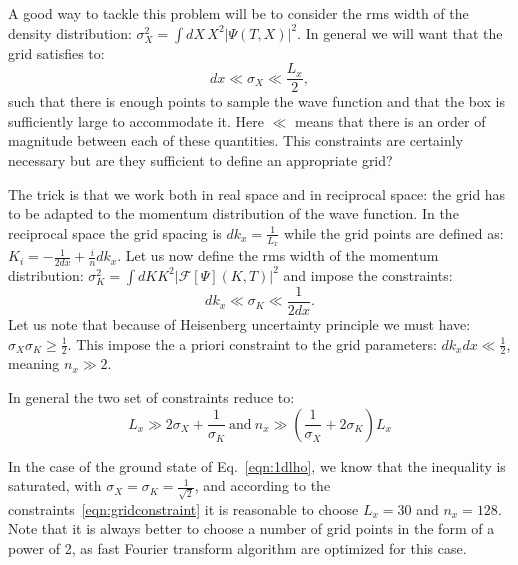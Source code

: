 \documentclass[12pt,a4paper]{report}
\newcommand{\abs}[1]{\left|#1\right|}
\newcommand{\fft}[1]{\mathcal{F}\left[#1\right]}
\begin{document}
A good way to tackle this problem will be to consider the rms width of the density distribution: $\sigma_X^2=\int dX\,X^2\abs{\Psi(T,X)}^2$.
In general we will want that the grid satisfies to:
\begin{equation}
dx\ll\sigma_X\ll\frac{L_x}{2},
\end{equation}
such that there is enough points to sample the wave function and that the box is sufficiently large to accommodate it.
Here $\ll$ means that there is an order of magnitude between each of these quantities.
This constraints are certainly necessary but are they sufficient to define an appropriate grid?

The trick is that we work both in real space and in reciprocal space: the grid has to be adapted to the momentum distribution of the wave function.
In the reciprocal space the grid spacing is $dk_x=\frac{1}{L_x}$ while the grid points are defined as: $K_i=-\frac{1}{2dx}+\frac{i}{n}dk_x$.
Let us now define the rms width of the momentum distribution: $\sigma_K^2=\int dK K^2\abs{\fft{\Psi}(K,T)}^2$ and impose the constraints:
\begin{equation}
dk_x\ll\sigma_K\ll\frac{1}{2dx}.
\end{equation}
Let us note that because of Heisenberg uncertainty principle we must have: $\sigma_X\sigma_K\geq\frac{1}{2}$. This impose the a priori constraint to the grid parameters: $dk_x dx\ll\frac{1}{2}$, meaning $n_x\gg2$.

In general the two set of constraints reduce to:
\begin{equation}
L_x\gg2\sigma_X+\frac{1}{\sigma_K}
~\textrm{and}~
n_x\gg\left(\frac{1}{\sigma_X}+2\sigma_K\right)L_x
\label{eqn:gridconstraint}
\end{equation}

In the case of the ground state of Eq.~\eqref{eqn:1dlho}, we know that the inequality is saturated, with $\sigma_X=\sigma_K=\frac{1}{\sqrt{2}}$, and according to the constraints~\eqref{eqn:gridconstraint} it is reasonable to choose $L_x=30$ and $n_x=128$.
Note that it is always better to choose a number of grid points in the form of a power of 2, as fast Fourier transform algorithm are optimized for this case.
\end{document}

